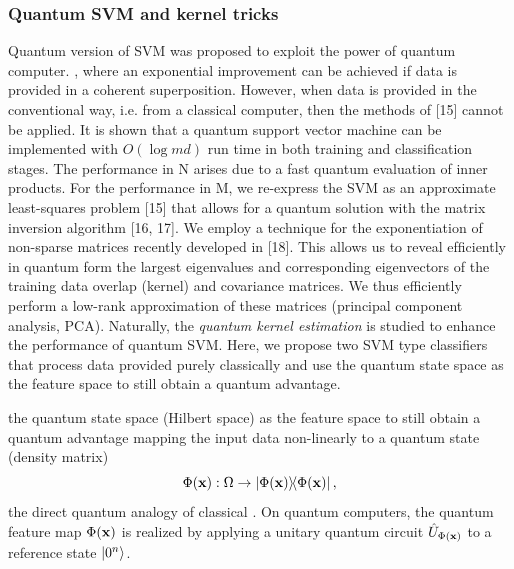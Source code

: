 \subsubsection{Quantum SVM and kernel tricks}
Quantum version of SVM was proposed \cite{rebentrostQuantumSupportVector2014} to exploit the power of quantum computer.
, where an exponential improvement can be achieved if data is provided in a coherent superposition. However, when data is provided in the conventional way, i.e. from a classical computer, then the methods of [15] cannot be applied. \cite{tangQuantuminspiredClassicalAlgorithm2019}
It is shown that a quantum support vector machine can be implemented with $O(\log md)$ run time in both training and classiﬁcation stages. 
The performance in N arises due to a fast quantum evaluation of inner products.
For the performance in M, we re-express the SVM as an approximate least-squares problem [15] that allows for a quantum solution with the matrix inversion algorithm [16, 17]. We employ a technique for the exponentiation of non-sparse matrices recently developed in [18]. This allows us to reveal efﬁciently in quantum form the largest eigenvalues and corresponding eigenvectors of the training data overlap (kernel) and covariance matrices. We thus efficiently perform a low-rank approximation of these matrices (principal component analysis, PCA).
Naturally, the \emph{quantum kernel estimation}
\cite{schuldQuantumMachineLearning2019}
\cite{havlicekSupervisedLearningQuantum2019} 
is studied to enhance the performance of quantum SVM.
Here, we propose two SVM type classifiers that process data provided purely classically and use the quantum state space as the feature space to still obtain a quantum advantage.
\begin{definition}\label{def:quantum_feature_map}
	the quantum state space (Hilbert space) as the feature space to still obtain a quantum advantage
	mapping the input data non-linearly to a quantum state (density matrix) 
	\begin{equation}
		\Phi(\vbx): \Omega \to \dyad{\Phi(\vbx)},
		\label{eq:quantum_feature_map}
	\end{equation}
	the direct quantum analogy of classical .
	On quantum computers, the quantum feature map $\Phi(\vb{x})$ is realized by applying a unitary quantum circuit $\hat{U}_{\Phi(\vb{x})}$ to a reference state $\ket{0^n}$.
\end{definition}

